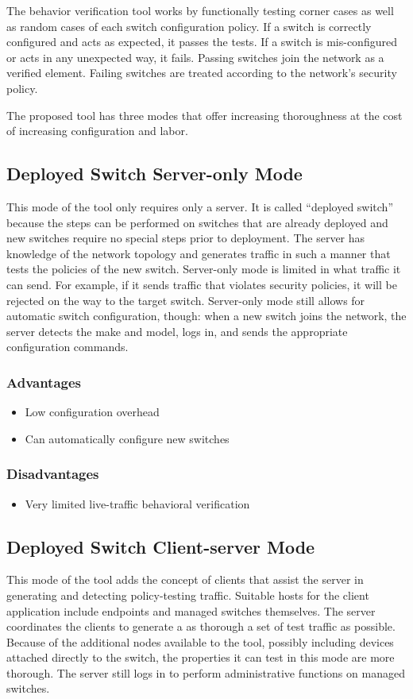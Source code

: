 \documentclass[journal]{IEEEtran}
\begin{document}
The behavior verification tool works by functionally testing corner cases as well as random cases
of each switch configuration policy. If a switch is correctly configured and acts as expected, it
passes the tests. If a switch is mis-configured or acts in any unexpected way, it fails. Passing
switches join the network as a verified element. Failing switches are treated according to the
network's security policy.

The proposed tool has three modes that offer increasing thoroughness at the cost of increasing
configuration and labor.

\subsection{Deployed Switch Server-only Mode}
This mode of the tool only requires only a server. It is called ``deployed switch'' because the
steps can be performed on switches that are already deployed and new switches require no special
steps prior to deployment. The server has knowledge of
the network topology and generates traffic in such a manner that tests the policies of the new
switch. Server-only mode is limited in what traffic it can send. For example, if it sends traffic
that violates security policies, it will be rejected on the way to the target switch.
Server-only mode still allows for automatic switch configuration, though: when a new switch
joins the network, the server detects the make and model, logs in, and sends the appropriate
configuration commands.
\subsubsection{Advantages}
\begin{itemize}
	\item Low configuration overhead
	\item Can automatically configure new switches
\end{itemize}
\subsubsection{Disadvantages}
\begin{itemize}
	\item Very limited live-traffic behavioral verification
\end{itemize}

\subsection{Deployed Switch Client-server Mode}
This mode of the tool adds the concept of clients that assist the server in generating and detecting
policy-testing traffic. Suitable hosts for the client application include endpoints and managed
switches themselves. The server coordinates the clients to generate a as thorough a set of
test traffic as possible. Because of the additional nodes available to the tool, possibly including
devices
attached directly to the switch, the properties it can test in this mode are more thorough. The
server still logs in to perform administrative functions on managed switches.
\end{document}
